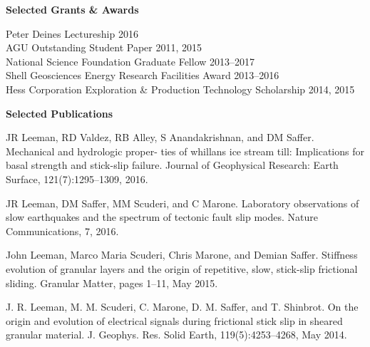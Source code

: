 \documentclass[11pt]{psuthesis}
\begin{document}
{\begin{singlespace}
\smallskip

\large
\vspace{-0.4cm}
\centerline{{\bf Selected Grants \& Awards}}
\normalsize

\medskip

\par\noindent
Peter Deines Lectureship \hfill 2016\\
AGU Outstanding Student Paper \hfill 2011, 2015\\
National Science Foundation Graduate Fellow \hfill 2013--2017\\
Shell Geosciences Energy Research Facilities Award \hfill 2013--2016\\
Hess Corporation Exploration \& Production Technology Scholarship \hfill 2014, 2015\\
\medskip

\large
\vspace{-0.6cm}
\centerline{{\bf Selected Publications}}
\normalsize

\noindent\hangindent=1cm JR Leeman, RD Valdez, RB Alley, S Anandakrishnan, and DM Saffer. Mechanical and hydrologic proper- ties of whillans ice stream till: Implications for basal strength and stick-slip failure. Journal of Geophysical Research: Earth Surface, 121(7):1295--1309, 2016.

\noindent\hangindent=1cm JR Leeman, DM Saffer, MM Scuderi, and C Marone. Laboratory observations of slow earthquakes and the spectrum of tectonic fault slip modes. Nature Communications, 7, 2016.

\noindent\hangindent=1cm John Leeman, Marco Maria Scuderi, Chris Marone, and Demian Saffer. Stiffness evolution of granular layers and the origin of repetitive, slow, stick-slip frictional sliding. Granular Matter, pages 1--11, May 2015.

\noindent\hangindent=1cm J. R. Leeman, M. M. Scuderi, C. Marone, D. M. Saffer, and T. Shinbrot. On the origin and evolution of electrical signals during frictional stick slip in sheared granular material. J. Geophys. Res. Solid Earth, 119(5):4253--4268, May 2014.



%



\end{singlespace}}
\end{document}

